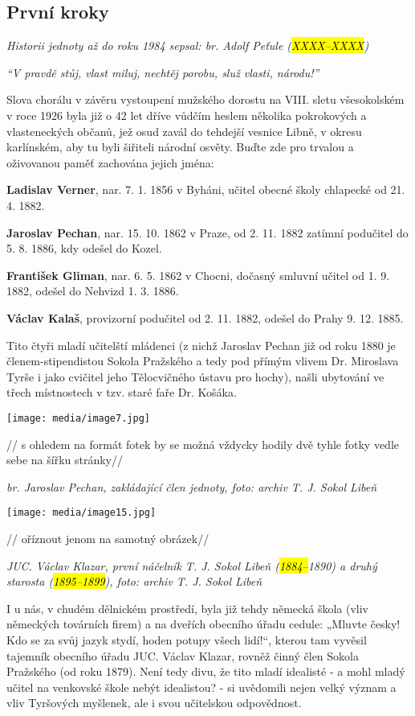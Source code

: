 \subsection{První kroky}\label{prvnuxed-kroky}

\emph{Historii jednoty až do roku 1984 sepsal: br. Adolf Peťule
(\hl{XXXX--XXXX})}

\emph{``V pravdě stůj, vlast miluj, nechtěj porobu, služ vlasti,
národu!''}

Slova chorálu v závěru vystoupení mužského dorostu na VIII. sletu
všesokolském v roce 1926 byla již o 42 let dříve vůdčím heslem několika
pokrokových a vlasteneckých občanů, jež osud zavál do tehdejší vesnice
Libně, v okresu karlínském, aby tu byli šiřiteli národní osvěty. Buďte
zde pro trvalou a oživovanou paměť zachována jejich jména:

\textbf{Ladislav Verner}, nar. 7. 1. 1856 v Byháni, učitel obecné školy
chlapecké od 21. 4. 1882.

\textbf{Jaroslav Pechan}, nar. 15. 10. 1862 v Praze, od 2. 11. 1882
zatímní podučitel do 5. 8. 1886, kdy odešel do Kozel.

\textbf{František Gliman}, nar. 6. 5. 1862 v Chocni, dočasný smluvní
učitel od 1. 9. 1882, odešel do Nehvizd 1. 3. 1886.

\textbf{Václav Kalaš}, provizorní podučitel od 2. 11. 1882, odešel do
Prahy 9. 12. 1885.

Tito čtyři mladí učitelští mládenci (z nichž Jaroslav Pechan již od roku
1880 je členem-stipendistou Sokola Pražského a tedy pod přímým vlivem
Dr. Miroslava Tyrše i jako cvičitel jeho Tělocvičného ústavu pro hochy),
našli ubytování ve třech místnostech v tzv. staré faře Dr. Košáka.

\texttt{[image: media/image7.jpg]}

// s ohledem na formát fotek by se možná vždycky hodily dvě tyhle fotky
vedle sebe na šířku stránky//

\emph{br. Jaroslav Pechan, zakládající člen jednoty, foto: archiv T. J.
Sokol Libeň}

\texttt{[image: media/image15.jpg]}

// oříznout jenom na samotný obrázek//

\emph{JUC. Václav Klazar, první náčelník T. J. Sokol Libeň
(\hl{1884--⁠⁠⁠⁠⁠⁠}1890) a druhý starosta (\hl{1895--⁠⁠⁠⁠⁠⁠1899}), foto: archiv T. J.
Sokol Libeň}

I u nás, v chudém dělnickém prostředí, byla již tehdy německá škola
(vliv německých továrních firem) a na dveřích obecního úřadu cedule:
„Mluvte česky! Kdo se za svůj jazyk stydí, hoden potupy všech lidí!{}``,
kterou tam vyvěsil tajemník obecního úřadu JUC. Václav Klazar, rovněž
činný člen Sokola Pražského (od roku 1879). Není tedy divu, že tito
mladí idealisté - a mohl mladý učitel na venkovské škole nebýt
idealistou? - si uvědomili nejen velký význam a vliv Tyršových myšlenek,
ale i svou učitelskou odpovědnost.

